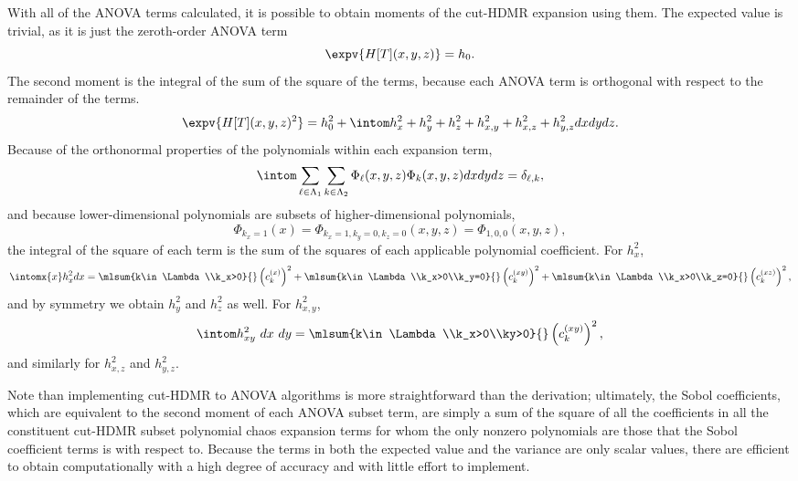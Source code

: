 With all of the ANOVA terms calculated, it is possible to obtain moments of the cut-HDMR expansion using them.
The expected value is trivial, as it is just the zeroth-order ANOVA term
\begin{equation}
  \expv{H[T](x,y,z)} = h_0.
\end{equation}
The second moment is the integral of the sum of the square of the terms, because each ANOVA term is orthogonal
with respect to the remainder of the terms.
\begin{equation}
  \expv{H[T](x,y,z)^2} = h_0^2 + \intom h_x^2 + h_y^2 + h_z^2 + h_{x,y}^2 + h_{x,z}^2 + h_{y,z}^2 dx dy dz.
\end{equation}
Because of the orthonormal properties of the polynomials within each expansion term,
\begin{equation}
  \intom \sum_{\ell\in\Lambda_1}\sum_{k\in\Lambda_2} \Phi_\ell(x,y,z)\Phi_k(x,y,z) dx dy dz = \delta_{\ell,k},
\end{equation}
and because lower-dimensional polynomials are subsets of higher-dimensional polynomials,
\begin{equation}
  \Phi_{k_x=1}(x) = \Phi_{k_x=1,k_y=0,k_z=0}(x,y,z) = \Phi_{1,0,0}(x,y,z),
\end{equation}
the integral of the square of each term is the sum of the squares of each applicable polynomial coefficient.  
For $h_x^2$,
\begin{equation}
  \intomx{x} h_x^2 dx = \mlsum{k\in\Lambda\\k_x>0}{}\left(c_k^{(x)}\right)^2 +
  \mlsum{k\in\Lambda\\k_x>0\\k_y=0}{} \left(c_k^{(xy)}\right)^2 + \mlsum{k\in\Lambda\\k_x>0\\k_z=0}{}
      \left(c_k^{(xz)}\right)^2,
\end{equation}
and by symmetry we obtain $h^2_y$ and $h^2_z$ as well.  For $h_{x,y}^2$,
\begin{equation}
  \intom h_{xy}^2\ dx\ dy = \mlsum{k\in\Lambda\\k_x>0\\ky>0}{}\left(c_k^{(xy)}\right)^2,
\end{equation}
and similarly for $h_{x,z}^2$ and $h_{y,z}^2$.

Note than implementing cut-HDMR to ANOVA algorithms is more straightforward than the derivation; ultimately, the Sobol
coefficients, which are equivalent to the second moment of each ANOVA subset term, are simply a sum of the
square of all the coefficients in all the constituent cut-HDMR subset polynomial chaos expansion terms for
whom the only nonzero polynomials are those that the Sobol coefficient terms is with respect to.  Because the
terms in both the expected value and the variance are only scalar values, there are efficient to obtain
computationally with a high degree of accuracy and with little effort to implement.


